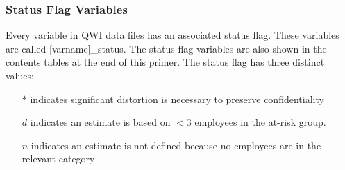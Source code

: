 
\subsubsection{Status Flag Variables}


Every variable in QWI data files has an associated status flag. These
variables are called \textsf{[varname]\_status}. The status flag variables
are also shown in the contents tables at the end of this primer. The status
flag has three distinct values:

\begin{itemize}
\item[$*$] indicates significant distortion is necessary to preserve
confidentiality

\item[$d$] indicates an estimate is based on $<3$ employees in the at-risk group.

\item[$n$] indicates an estimate is not defined because no employees are in
the relevant category
\end{itemize}


% 
% 

